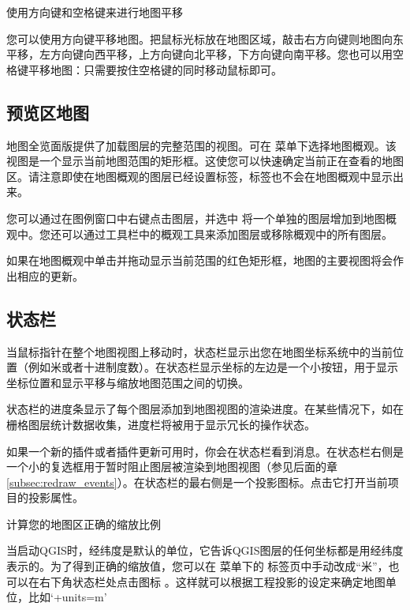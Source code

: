 \begin{Tip}\caption{\textsc{使用方向键和空格键来进行地图平移}}
您可以使用方向键平移地图。把鼠标光标放在地图区域，敲击右方向键则地图向东平移，左方向键向西平移，上方向键向北平移，下方向键向南平移。您也可以用空格键平移地图：只需要按住空格键的同时移动鼠标即可。
\end{Tip}

\subsection{预览区地图}\label{label_mapoverview}

地图全览面版提供了加载图层的完整范围的视图。可在  \arrow {} 菜单下选择地图概观。该视图是一个显示当前地图范围的矩形框。这使您可以快速确定当前正在查看的地图区。请注意即使在地图概观的图层已经设置标签，标签也不会在地图概观中显示出来。

您可以通过在图例窗口中右键点击图层，并选中  将一个单独的图层增加到地图概观中。您还可以通过工具栏中的概观工具来添加图层或移除概观中的所有图层。

如果在地图概观中单击并拖动显示当前范围的红色矩形框，地图的主要视图将会作出相应的更新。

\subsection{状态栏}\label{label_statusbar}

当鼠标指针在整个地图视图上移动时，状态栏显示出您在地图坐标系统中的当前位置（例如米或者十进制度数）。在状态栏显示坐标的左边是一个小按钮，用于显示坐标位置和显示平移与缩放地图范围之间的切换。

状态栏的进度条显示了每个图层添加到地图视图的渲染进度。在某些情况下，如在栅格图层统计数据收集，进度栏将被用于显示冗长的操作状态。

如果一个新的插件或者插件更新可用时，你会在状态栏看到消息。在状态栏右侧是一个小的复选框用于暂时阻止图层被渲染到地图视图（参见后面的章 \ref{subsec:redraw_events}）。在状态栏的最右侧是一个投影图标。点击它打开当前项目的投影属性。

\begin{Tip}\caption{\textsc{计算您的地图区正确的缩放比例}}
当启动QGIS时，经纬度是默认的单位，它告诉QGIS图层的任何坐标都是用经纬度表示的。为了得到正确的缩放值，您可以在  \arrow {} 菜单下的  标签页中手动改成“米”，也可以在右下角状态栏处点击图标  。这样就可以根据工程投影的设定来确定地图单位，比如‘+units=m’
\end{Tip}

